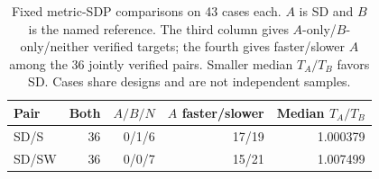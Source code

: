 \documentclass[sigconf,anonymous,review]{acmart}
\newcommand{\1}{\mathbf{1}}
\begin{document}
\begin{table}[t]
\caption{Fixed metric-SDP comparisons on 43 cases each. $A$ is SD and $B$
is the named reference. The third column gives $A$-only/$B$-only/neither
verified targets; the fourth gives faster/slower $A$ among the 36 jointly
verified pairs. Smaller median $T_A/T_B$ favors SD. Cases share designs and
are not independent samples.}\label{tab:metric-main}
\centering\small
\begin{tabular}{lrrrr}\toprule
Pair & Both & $A/B/N$ & $A$ faster/slower & Median $T_A/T_B$\\\midrule
SD/S & 36 & 0/1/6 & 17/19 & 1.000379\\
SD/SW & 36 & 0/0/7 & 15/21 & 1.007499\\\bottomrule
\end{tabular}
\end{table}
\end{document}
